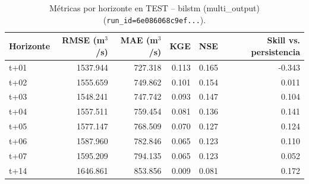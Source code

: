 \begin{table}[H]
\centering
\caption{M\'etricas por horizonte en TEST -- bilstm (multi\_output) (\texttt{run\_id=6e086068c9ef...}).}
\label{tab:metrics-6e086068c9ef}
\begin{tabular}{lrrrrr}
\toprule
Horizonte & RMSE (m$^3$/s) & MAE (m$^3$/s) & KGE & NSE & Skill vs. persistencia \\
\midrule
t+01 & 1537.944 & 727.318 & 0.113 & 0.165 & -0.343 \\
t+02 & 1555.659 & 749.862 & 0.101 & 0.154 & 0.011 \\
t+03 & 1548.241 & 747.742 & 0.093 & 0.147 & 0.104 \\
t+04 & 1557.511 & 759.454 & 0.081 & 0.136 & 0.141 \\
t+05 & 1577.147 & 768.509 & 0.070 & 0.127 & 0.124 \\
t+06 & 1587.960 & 782.846 & 0.065 & 0.123 & 0.110 \\
t+07 & 1595.209 & 794.135 & 0.065 & 0.123 & 0.052 \\
t+14 & 1646.861 & 853.856 & 0.009 & 0.081 & 0.172 \\
\bottomrule
\end{tabular}
\end{table}
